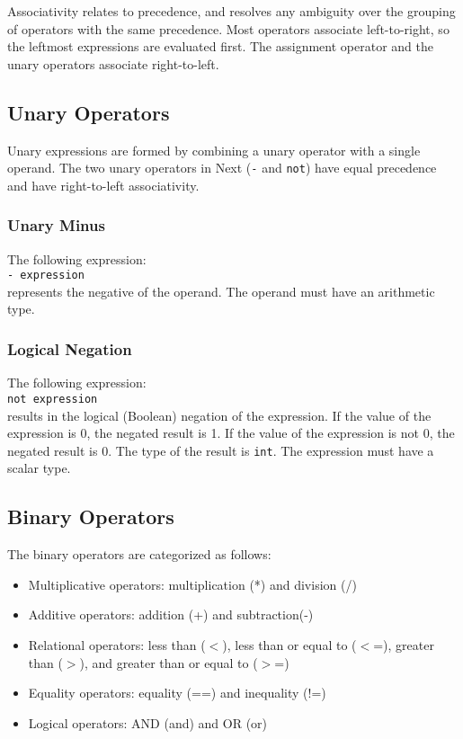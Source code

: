 \documentclass[12pt]{article}
\begin{document}
\noindent Associativity relates to precedence, and resolves any ambiguity over the grouping of operators with the same precedence.  Most operators associate left-to-right, so the leftmost expressions are evaluated first.  The assignment operator  and the unary operators associate right-to-left.

\subsection{Unary Operators}
Unary expressions are formed by combining a unary operator with a single operand.  The two unary operators in Next (\texttt{-} and \texttt{not}) have equal precedence and have right-to-left associativity.

\subsubsection {Unary Minus}

The following expression: \\

\texttt{- expression} \\

\noindent represents the negative of the operand.  The operand must have an arithmetic type.

\subsubsection{Logical Negation}

The following expression: \\

\texttt{not expression} \\

\noindent results in the logical (Boolean) negation of the expression.  If the value of the expression is 0, the negated result is 1.  If the value of the expression is not 0, the negated result is 0.  The type of the result is \texttt{int}.  The expression must have a scalar type.

\subsection{Binary Operators}
The binary operators are categorized as follows:
\begin{itemize}
\item Multiplicative operators: multiplication (*) and division (/)
\item Additive operators: addition (+) and subtraction(-)
\item Relational operators: less than ($<$), less than or equal to ($<$=), greater than ($>$), and greater than or equal to ($>$=)
\item Equality operators: equality (==) and inequality (!=)
\item Logical operators: AND (and) and OR (or)
\end{itemize}
\end{document}

